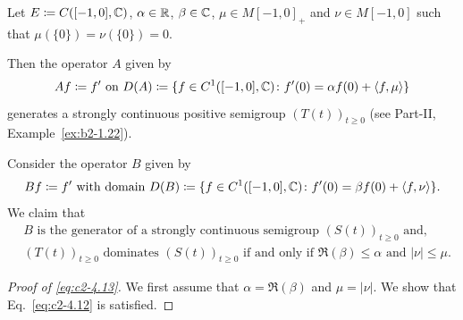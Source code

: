 \begin{example}\label{ex:c2-4.14}
Let $E \coloneq C([-1,0],\mathbb{C})$, $\alpha \in \mathbb{R}$, $\beta \in \mathbb{C}$, $\mu \in M[-1,0]_{+}$
and $\nu \in M[-1,0]$ such that $\mu(\{0\}) = \nu(\{0\}) = 0$.

Then the operator $A$ given by 
\[
Af \coloneq f' \text{ on } D(A) \coloneq \{f \in C^{1}([-1,0],\mathbb{C}) \colon f'(0) = \alpha f(0) + \langle f,\mu\rangle\}
\]
generates a strongly continuous positive semigroup $(T(t))_{t \geq 0}$ 
(see Part-II, Example~\ref{ex:b2-1.22}).

Consider the operator $B$ given by
\[Bf \coloneq f' \text{ with domain } D(B) \coloneq \{f \in C^{1}([-1,0],\mathbb{C}) \colon f'(0) = \beta f(0) + \langle f,\nu \rangle\}.
\]
We claim that
\begin{equation}\label{eq:c2-4.13}
\begin{split}
& B  \text{ is the generator of a strongly continuous semigroup } (S(t))_{t \geq 0}  
\text{ and, } \\ 
&(T(t))_{t \geq 0} \text{ dominates } (S(t))_{t \geq 0} 
\text{ if and only if } \Re(\beta) \leq \alpha \text{ and } |\nu| \leq \mu .
\end{split} 
\end{equation}
\begin{proof}[Proof of \eqref{eq:c2-4.13}]
We first assume that $\alpha = \Re(\beta)$ and $\mu = |\nu|$.
We show that Eq.~\eqref{eq:c2-4.12} is satisfied.


\end{proof}
\end{example}
